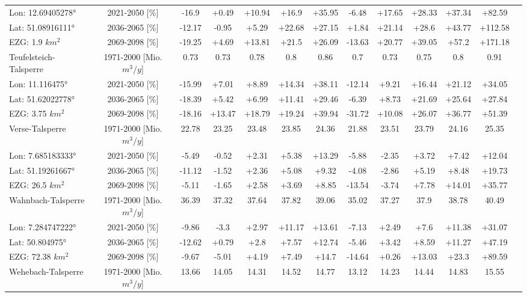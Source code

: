 \begin{longtable}{@{\extracolsep{\fill}}lc|ccccc||cccccc}
\cline{2-13} 
Lon: 12.69405278° & 2021-2050 [\%]  & -16.9 & +0.49 & +10.94 & +16.9 & +35.95 & -6.48 & +17.65 & +28.33 & +37.34 & +82.59 & \\ 
Lat: 51.08916111° & 2036-2065 [\%]  & -12.17 & -0.95 & +5.29 & +22.68 & +27.15 & +1.84 & +21.14 & +28.6 & +43.77 & +112.58 & \\ 
EZG: 1.9 $km^2$ & 2069-2098 [\%]  & -19.25 & +4.69 & +13.81 & +21.5 & +26.09 & -13.63 & +20.77 & +39.05 & +57.2 & +171.18 & \\ 
\hline 
Teufelsteich-Talsperre & 1971-2000 [Mio. $m^3/y$]  & 0.73 & 0.73 & 0.78 & 0.8 & 0.86 & 0.7 & 0.73 & 0.75 & 0.8 & 0.91 & \\ 
\cline{2-13} 
Lon: 11.116475° & 2021-2050 [\%]  & -15.99 & +7.01 & +8.89 & +14.34 & +38.11 & -12.14 & +9.21 & +16.44 & +21.12 & +34.05 & \\ 
Lat: 51.62022778° & 2036-2065 [\%]  & -18.39 & +5.42 & +6.99 & +11.41 & +29.46 & -6.39 & +8.73 & +21.69 & +25.64 & +27.84 & \\ 
EZG: 3.75 $km^2$ & 2069-2098 [\%]  & -18.16 & +13.47 & +18.79 & +19.24 & +39.94 & -31.72 & +10.08 & +26.07 & +36.77 & +51.39 & \\ 
\hline 
Verse-Talsperre & 1971-2000 [Mio. $m^3/y$]  & 22.78 & 23.25 & 23.48 & 23.85 & 24.36 & 21.88 & 23.51 & 23.79 & 24.16 & 25.35 & \\ 
\cline{2-13} 
Lon: 7.685183333° & 2021-2050 [\%]  & -5.49 & -0.52 & +2.31 & +5.38 & +13.29 & -5.88 & -2.35 & +3.72 & +7.42 & +12.04 & \\ 
Lat: 51.19261667° & 2036-2065 [\%]  & -11.12 & -1.52 & +2.36 & +5.08 & +9.32 & -4.08 & -2.86 & +5.19 & +8.48 & +19.73 & \\ 
EZG: 26.5 $km^2$ & 2069-2098 [\%]  & -5.11 & -1.65 & +2.58 & +3.69 & +8.85 & -13.54 & -3.74 & +7.78 & +14.01 & +35.77 & \\ 
\hline 
Wahnbach-Talsperre & 1971-2000 [Mio. $m^3/y$]  & 36.39 & 37.32 & 37.64 & 37.82 & 39.06 & 35.02 & 37.27 & 37.9 & 38.78 & 40.49 & \\ 
\cline{2-13} 
Lon: 7.284747222° & 2021-2050 [\%]  & -9.86 & -3.3 & +2.97 & +11.17 & +13.61 & -7.13 & +2.49 & +7.6 & +11.38 & +31.07 & \\ 
Lat: 50.804975° & 2036-2065 [\%]  & -12.62 & +0.79 & +2.8 & +7.57 & +12.74 & -5.46 & +3.42 & +8.59 & +11.27 & +47.19 & \\ 
EZG: 72.38 $km^2$ & 2069-2098 [\%]  & -9.67 & -5.01 & +4.19 & +7.49 & +14.7 & -14.64 & +0.26 & +13.03 & +23.3 & +89.59 & \\ 
\hline 
Wehebach-Talsperre & 1971-2000 [Mio. $m^3/y$]  & 13.66 & 14.05 & 14.31 & 14.52 & 14.77 & 13.12 & 14.23 & 14.44 & 14.83 & 15.55 & \\ 

\end{longtable}
